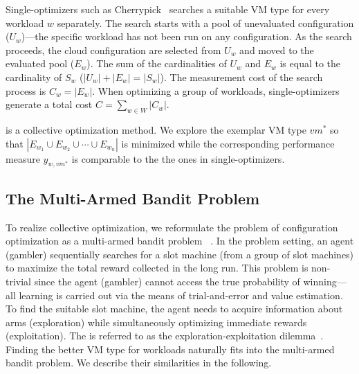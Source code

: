 Single-optimizers such as Cherrypick~\cite{Alipourfard2017} searches a suitable VM type for every workload $w$ separately.
The search starts with a pool of unevaluated configuration ($U_w$)---the specific workload has not been run on any configuration.
As the search proceeds, the cloud configuration are selected from $U_w$ and moved to the evaluated pool ($E_w$). The sum of the cardinalities
of $U_w$ and $E_w$ is equal to the cardinality of $S_w$ ($|U_w| +|E_w| = |S_w|$).
The measurement cost of the search process is $C_w=|E_w|$.
When optimizing a group of workloads,
single-optimizers generate a total cost $C=\sum_{w \in W} |C_w|$.

\micky is a collective optimization method.
We explore the exemplar VM type $vm^*$ so that 
$|E_{w_1} \cup E_{w_2} \cup \cdots \cup E_{w_n}|$ is minimized while the corresponding performance measure
$y_{w, vm^*}$ is comparable to the the ones in single-optimizers.



\subsection{The Multi-Armed Bandit Problem}

To realize collective optimization, we reformulate the problem of configuration optimization as a multi-armed bandit problem~
\cite{robbins1985some,weber1992gittins,bergemann2006bandit,audibert2011introduction}.
In the problem setting,
an agent  (gambler) sequentially searches for a slot machine (from a group of slot machines) to maximize the total reward collected in the long run. This problem is non-trivial since the agent (gambler) cannot access the true probability of winning---all learning is carried out via the means of trial-and-error and value estimation. To find the suitable slot machine, the agent needs to acquire information about arms  (exploration)  while  simultaneously  optimizing  immediate rewards  (exploitation).
The is referred to as the exploration-exploitation dilemma~\cite{kaelbling1996reinforcement}.
Finding the better VM type for workloads naturally fits into the multi-armed bandit problem.
We describe their similarities in the following.

